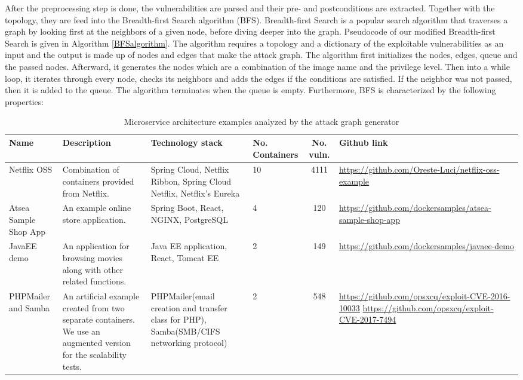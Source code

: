 After the preprocessing step is done, the vulnerabilities are parsed and their pre- and postconditions are extracted. Together with the topology, they are feed into the Breadth-first Search algorithm (BFS).
Breadth-first Search is a popular search algorithm that traverses a graph by looking first at the neighbors of a given node, before diving deeper into the graph. Pseudocode of our modified Breadth-first Search is given in Algorithm \ref{BFSalgorithm}. The algorithm requires a topology and a dictionary of the exploitable vulnerabilities as an input and the output is made up of nodes and edges that make the attack graph. The algorithm first initializes the nodes, edges, queue and the passed nodes. Afterward, it generates the nodes which are a combination of the image name and the privilege level. Then into a while loop, it iterates through every node, checks its neighbors and adds the edges if the conditions are satisfied. If the neighbor was not passed, then it is added to the queue. The algorithm terminates when the queue is empty. Furthermore, BFS is characterized by the following properties:

\begin{table}[t]
	\begin{center}
		\begin{tabular}{ p{20mm}p{35mm}p{35mm}p{10mm}cp{35mm} } 
			\hline
			Name & Description & Technology stack & No. Containers & No. vuln. & Github link \\\hline 
			
			Netflix OSS & Combination of containers provided from Netflix. & Spring Cloud, Netflix Ribbon, Spring Cloud Netflix, Netflix's Eureka & 10 & 4111 & \url{https://github.com/Oreste-Luci/netflix-oss-example} \\
			
			Atsea Sample Shop App & An example online store application. & Spring Boot, React, NGINX, PostgreSQL & 4 & 120 & \url{https://github.com/dockersamples/atsea-sample-shop-app} \\
			
			JavaEE demo & An application for browsing movies along with other related functions. & Java EE application, React, Tomcat EE & 2 & 149 & \url{https://github.com/dockersamples/javaee-demo} \\
			
			PHPMailer and Samba & An artificial example created from two separate containers. We use an augmented version for the scalability tests. & PHPMailer(email creation and transfer class for PHP), Samba(SMB/CIFS networking protocol) & 2 & 548 &  \url{https://github.com/opsxcq/exploit-CVE-2016-10033}
			\url{https://github.com/opsxcq/exploit-CVE-2017-7494} \\
			
			
			\hline
		\end{tabular}
	\end{center}
	
	\caption{Microservice architecture examples analyzed by the attack graph generator}
	\label{table_technologies}
	
\end{table}

